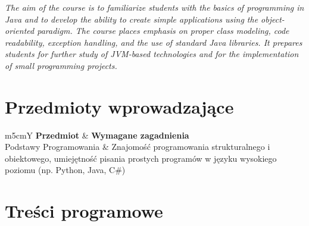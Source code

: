 \documentclass[12pt, a4paper]{article}
\newcommand{\thdrule}{\noalign{\global\setlength{\extrarowheight}{0pt}}}
\newcommand{\thdend}{\noalign{\global\setlength{\extrarowheight}{3pt}}}
\begin{document}
\textit{The aim of the course is to familiarize students with the basics of programming in Java and to develop the ability to create simple applications using the object-oriented paradigm. The course places emphasis on proper class modeling, code readability, exception handling, and the use of standard Java libraries. It prepares students for further study of JVM-based technologies and for the implementation of small programming projects.}


\section{Przedmioty wprowadzające}

{\scriptsize
\begin{tabularx}{\textwidth}{m{5cm}Y}
\thdrule\toprule
{} {\color{white}\textbf{Przedmiot}} & {\color{white}\textbf{Wymagane zagadnienia}} \\
\midrule\thdend
   Podstawy Programowania & Znajomość programowania strukturalnego i obiektowego, umiejętność pisania prostych programów w języku wysokiego poziomu (np. Python, Java, C\#) \\
\bottomrule
\end{tabularx}}

\section{Treści programowe}
\end{document}
